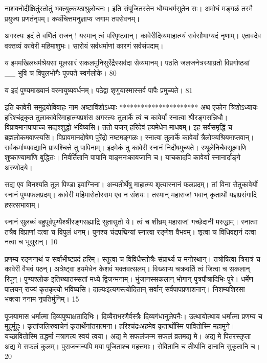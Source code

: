   नाशक्नोदीक्षितुंस्तोतुं भक्त्युत्कण्ठाश्रुलोचनः।
 इति संपूजितस्तेन धौम्यधर्मसुतेन सः।
 अमोघं मङ्गळं तस्मै प्रयुज्य प्रणतंनृपम्।
 कथंचित्तमनुज्ञाप्य जगाम तपसेवनम्।
 
अगस्त्यः
इदं ते वर्णितं राजन् ! यस्मान् त्वं परिपृष्टवान्।
 कावेरीदिव्यमाहात्म्यं सर्वसौभाग्यदं नृणाम्।
 एतावदेव वक्तव्यं कावेरी महिमाशुभः।
 सारोयं सर्वधर्माणां कारणं सर्वसंपदाम्।
 
य इममखिलधर्मश्रेयसां मूलसारं
सकलमुनिसुरेंद्रैस्सर्वदा सेव्यमानम्।
 पठति जलजनेत्रस्याग्रतो विप्रगोष्ठ्यां __ भुवि च विपुलभोगैः पूज्यते स्वर्गलोके।
 80

  य इदं पुण्यमाख्यानं वरमायुष्यवर्धनम्।
 पठेद्वा शृणुयास्मास्सर्व पापैः प्रमुच्यते।
 81

  इति कावेरी समुद्रयोविवाहः नाम अष्टाविंशोऽध्याः
**********************
अथ एकोन त्रिंशोऽध्यायः हरिश्चंद्रकृत तुलाकावेरिमाहात्म्यप्रशंस
अगस्त्यः
तुलार्के त्वं च कावेर्यां स्नात्वा श्रीरङ्गसन्निधौ।
 विप्रावमानपापाच्च सद्यश्शुद्धो भविष्यसि।
 ततो यजन् हरिदेवं हयमेधेन माधवम्।
 इह सर्वसमृद्धिं च ब्रह्मलोकमवाप्स्यसि।
 विप्रावमानदोषेण पुरेंद्रो नष्टमङ्गळः।
 स्नात्वा तुलार्के कावेर्यां त्रैलोक्यश्रियमाप्तवान्।
 सर्वकर्माण्यवद्यानि प्रायश्चित्ते तु पापिनाम्।
 इदमेकं तु कावेरी स्नानं निर्दोषमुच्यते।
 स्थूलेनिचैवसूक्ष्माणि शुष्काण्यामा॑णि बुद्धितः।
 निर्वर्तितानि पापानि वाङ्मनःकायजानि च।
 याचकादपि कावेर्यां स्नानार्दाङ्गे अरुणोदये।
 
सद्य एव विनश्यति तूल पिण्डा इवाग्निना।
 अन्यतीर्थेषु माहात्म्य शृत्यास्नानं फलप्रदम्।
 तां विना सेतुकावेर्यो स्नानं पुण्यफलप्रदम्।
 कावेरी महिमासेतोस्सम एव न संशयः।
 तस्मान् महाराज! भवान् कृतार्थो यज्ञप्रसंगादि
हसत्सभायाम्।

स्नानं सुलब्धं बहुपूर्वपुण्यैश्श्रीरङ्गसह्याद्रि सुतासुतो ये।
 त्वं च शीघ्रम् महाराज! गच्छेदानी मरुद्धाम्।
 स्नात्वा तत्रैव विप्राणां दत्वा च विपुलं धनम्।
 पुनश्च चंद्रपद्मिन्यां स्नात्वा रङ्गेश वैभवम्।
 शृत्वा च विधिवद्दानं दत्वा नत्वा च भूसुरान्।
 10

  प्रणम्य रङ्गनाथं च सर्वाभीष्टप्रदं हरिम्।
 स्तुत्वा च विविधैस्तोत्रैः संप्रार्थ्य च मनोरथान्।
 तत्रोषित्वा त्रिरात्रं च कावेरी वैभवं पठन्।
 अत्रेष्ट्वा हयमेधेन केशवं भक्तवत्सलम्।
 विख्याप्य चक्रवर्ति त्वं जित्वा च सकलान् रिपून्।
 पुण्यश्लोक इतिख्यातस्सतां मध्ये द्विजन्मनाम्।
 भुंजानस्सकलान् भोगान् पुत्रपौत्रादिभिः पुरे।
 धर्मेण पालयन् राज्यं कृतकृत्यो भविष्यसि।
 दाल्यःइत्यगस्त्योदितान् सर्वान् सर्वपापप्रणाशनान्।
 निशम्यशिरसा भक्त्या ननाम नृपतिर्मुनिम्।
 15

 
पूजयामास धर्मात्मा दिव्यपुष्पाक्षतादिभिः।
 दिव्यैराभरणैर्वस्त्रैः दिव्यगंधानुलेपनैः।
 उत्थायोत्थाय धर्मात्मा प्रणम्य च मुहुर्मुहुः।
 कृतांजलिरुवाचेनं कृतार्थेनांतरात्मना।
 हरिश्चंद्रःअहमेव कृतार्थोस्मि पावितोस्मि महामुने।
 यच्छावितोस्मि तद्धर्मा नत्रागत्य स्वयं त्वया।
 अद्य मे सफलंजन्म सफलं व्रतमद्य मे।
 अद्य मे पितरस्तृप्ता अद्य मे सफलं कुलम्।
 पुराजन्मन्यपि मया पूजिताश्च महत्तमाः।
 सेवितानि च तीर्थानि दानानि सुकृतानि च।
 20

